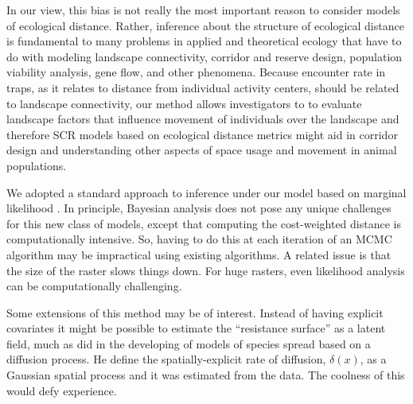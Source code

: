 \documentclass[12pt]{article}
\begin{document}
In our view, this bias is not really the most important reason to consider models of
ecological distance. Rather, inference about the structure of
ecological distance is fundamental to many problems in applied and
theoretical ecology that have to do with modeling landscape
connectivity, corridor and reserve design, population viability
analysis, gene flow, and other phenomena. 
Because encounter rate in traps, as it relates to distance from
individual activity centers, should be related to landscape
connectivity, our method allows investigators to to evaluate landscape
factors that influence movement of individuals over the landscape and
therefore SCR models based on ecological distance metrics might aid in
corridor design and understanding other aspects of space usage and
movement in animal populations. 

We adopted a standard approach to inference under our model based on
marginal likelihood \citep{borchers_efford:2008}. In principle, 
Bayesian analysis does not pose any unique challenges for this new
class of models, except that computing the cost-weighted distance is
computationally intensive. 
 So, having to do this at each iteration of an
MCMC algorithm may be impractical using existing algorithms.
A related issue is that the size of the raster slows things down. For
huge rasters, even likelihood analysis can be computationally challenging.

Some extensions of this method may be of interest. Instead of 
having explicit covariates it might be possible to estimate the 
``resistance surface'' as a latent field, much as \citep{wikle:2003}
 did in the developing of models of species spread based on a
 diffusion process. He define the spatially-explicit rate of 
diffusion, $\delta(x)$, as a Gaussian spatial process and it was
estimated from the data.  The coolness of this would defy experience. 














\newpage



\newpage




\end{document}
